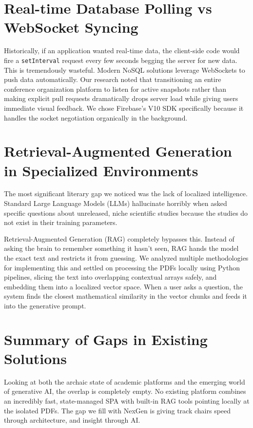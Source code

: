 \documentclass[12pt,a4paper]{report}
\begin{document}
\section{Real-time Database Polling vs WebSocket Syncing}
Historically, if an application wanted real-time data, the client-side code would fire a \texttt{setInterval} request every few seconds begging the server for new data. This is tremendously wasteful. Modern NoSQL solutions leverage WebSockets to push data automatically. Our research noted that transitioning an entire conference organization platform to listen for active snapshots rather than making explicit pull requests dramatically drops server load while giving users immediate visual feedback. We chose Firebase’s V10 SDK specifically because it handles the socket negotiation organically in the background. 

\section{Retrieval-Augmented Generation in Specialized Environments}
The most significant literary gap we noticed was the lack of localized intelligence. Standard Large Language Models (LLMs) hallucinate horribly when asked specific questions about unreleased, niche scientific studies because the studies do not exist in their training parameters. 

Retrieval-Augmented Generation (RAG) completely bypasses this. Instead of asking the brain to remember something it hasn’t seen, RAG hands the model the exact text and restricts it from guessing. We analyzed multiple methodologies for implementing this and settled on processing the PDFs locally using Python pipelines, slicing the text into overlapping contextual arrays safely, and embedding them into a localized vector space. When a user asks a question, the system finds the closest mathematical similarity in the vector chunks and feeds it into the generative prompt.

\section{Summary of Gaps in Existing Solutions}
Looking at both the archaic state of academic platforms and the emerging world of generative AI, the overlap is completely empty. No existing platform combines an incredibly fast, state-managed SPA with built-in RAG tools pointing locally at the isolated PDFs. The gap we fill with NexGen is giving track chairs speed through architecture, and insight through AI.
\end{document}

